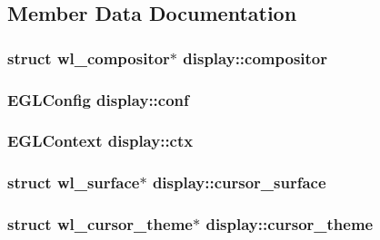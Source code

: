 \subsection{Member Data Documentation}
\hypertarget{structdisplay_a41ba32dfde812165dda5b62885000c78}{
\subsubsection[{compositor}]{\setlength{\rightskip}{0pt plus 5cm}struct wl\-\_\-compositor$\ast$ display\-::compositor}}\label{structdisplay_a41ba32dfde812165dda5b62885000c78}
\hypertarget{structdisplay_a880aef9408b499f5b749541dc6e396c3}{
\subsubsection[{conf}]{\setlength{\rightskip}{0pt plus 5cm}E\-G\-L\-Config display\-::conf}}\label{structdisplay_a880aef9408b499f5b749541dc6e396c3}
\hypertarget{structdisplay_a3420940a29a710e0e5ebd41ba462cc00}{
\subsubsection[{ctx}]{\setlength{\rightskip}{0pt plus 5cm}E\-G\-L\-Context display\-::ctx}}\label{structdisplay_a3420940a29a710e0e5ebd41ba462cc00}
\hypertarget{structdisplay_a88395d1fffcedd8b841a42e9bd6f7d59}{
\subsubsection[{cursor\-\_\-surface}]{\setlength{\rightskip}{0pt plus 5cm}struct wl\-\_\-surface$\ast$ display\-::cursor\-\_\-surface}}\label{structdisplay_a88395d1fffcedd8b841a42e9bd6f7d59}
\hypertarget{structdisplay_a144dd8ac007f779b6eaf1689e225cb35}{
\subsubsection[{cursor\-\_\-theme}]{\setlength{\rightskip}{0pt plus 5cm}struct wl\-\_\-cursor\-\_\-theme$\ast$ display\-::cursor\-\_\-theme}}\label{structdisplay_a144dd8ac007f779b6eaf1689e225cb35}
